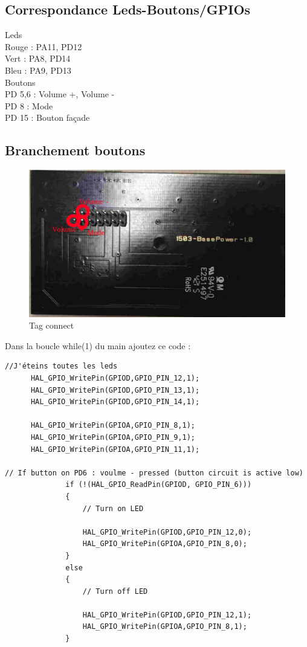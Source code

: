 \documentclass{article}
\begin{document}
\subsection{Correspondance Leds-Boutons/GPIOs}

Leds\\
Rouge : PA11, PD12 \\
Vert : PA8, PD14 \\
Bleu : PA9, PD13 \\


Boutons \\
PD 5,6 : Volume +, Volume - \\
PD 8 : Mode \\
PD 15 : Bouton façade \\

\subsection{Branchement boutons}

\begin{figure}[H]
\begin{center}
\advance\leftskip-3cm
\advance\rightskip-3cm
\includegraphics[keepaspectratio=true,scale=0.3]{branchement_boutons2.png}
\caption{Tag connect}
\label{visina8}
\end{center}\end{figure}



Dans la boucle while(1) du main ajoutez ce code :
\begin{verbatim}
//J'éteins toutes les leds
	  HAL_GPIO_WritePin(GPIOD,GPIO_PIN_12,1);
	  HAL_GPIO_WritePin(GPIOD,GPIO_PIN_13,1);
	  HAL_GPIO_WritePin(GPIOD,GPIO_PIN_14,1);

	  HAL_GPIO_WritePin(GPIOA,GPIO_PIN_8,1);
	  HAL_GPIO_WritePin(GPIOA,GPIO_PIN_9,1);
	  HAL_GPIO_WritePin(GPIOA,GPIO_PIN_11,1);

// If button on PD6 : voulme - pressed (button circuit is active low)
	          if (!(HAL_GPIO_ReadPin(GPIOD, GPIO_PIN_6)))
	          {
	              // Turn on LED

	              HAL_GPIO_WritePin(GPIOD,GPIO_PIN_12,0);
	              HAL_GPIO_WritePin(GPIOA,GPIO_PIN_8,0);
	          }
	          else
	          {
	              // Turn off LED

	              HAL_GPIO_WritePin(GPIOD,GPIO_PIN_12,1);
	              HAL_GPIO_WritePin(GPIOA,GPIO_PIN_8,1);
	          }

\end{verbatim}
\end{document}
